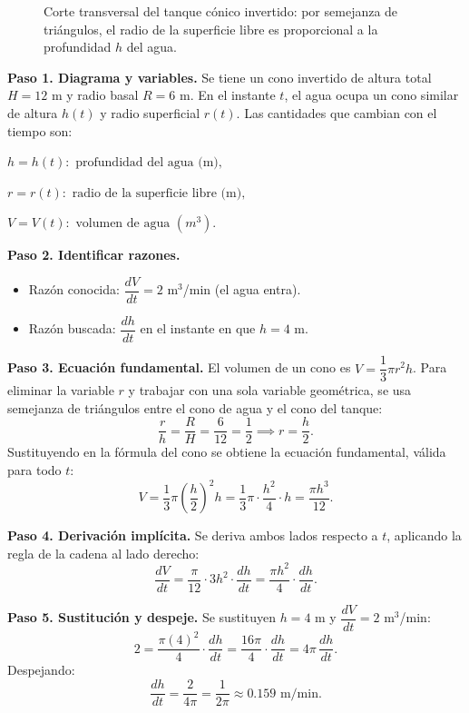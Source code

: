 \begin{example}
\begin{myproof}
\begin{figure}[H]
\caption{Corte transversal del tanque cónico invertido: por semejanza de
  triángulos, el radio de la superficie libre es proporcional a la
  profundidad $h$ del agua.}
\label{fig:tanque_conico}
\end{figure}
\textbf{Paso 1. Diagrama y variables.}
Se tiene un cono invertido de altura total $H=12$ m y radio basal
$R=6$ m. En el instante $t$, el agua ocupa un cono similar de altura
$h(t)$ y radio superficial $r(t)$. Las cantidades que cambian con el
tiempo son:


\(h = h(t): \text{ profundidad del agua (m)},\) 


\(r = r(t): \text{ radio de la superficie libre (m)}, \) 


\(V = V(t): \text{ volumen de agua $(m^{3})$}.\)

\textbf{Paso 2. Identificar razones.}
\begin{itemize}
    \item Razón conocida: $\dfrac{dV}{dt} = 2$ m$^3$/min (el agua entra).
    \item Razón buscada: $\dfrac{dh}{dt}$ en el instante en que $h = 4$ m.
\end{itemize}

\textbf{Paso 3. Ecuación fundamental.}
El volumen de un cono es $V = \dfrac{1}{3}\pi r^2 h$.
Para eliminar la variable $r$ y trabajar con una sola variable
geométrica, se usa semejanza de triángulos entre el cono de agua y el
cono del tanque:
\[
\frac{r}{h} = \frac{R}{H} = \frac{6}{12} = \frac{1}{2}
\implies r = \frac{h}{2}.
\]
Sustituyendo en la fórmula del cono se obtiene la ecuación fundamental,
válida para todo $t$:
\[
V = \frac{1}{3}\pi \left(\frac{h}{2}\right)^2 h
  = \frac{1}{3}\pi \cdot \frac{h^2}{4} \cdot h
  = \frac{\pi h^3}{12}.
\]

\textbf{Paso 4. Derivación implícita.}
Se deriva ambos lados respecto a $t$, aplicando la regla de la cadena
al lado derecho:
\[
\frac{dV}{dt} = \frac{\pi}{12} \cdot 3h^2 \cdot \frac{dh}{dt}
              = \frac{\pi h^2}{4}\cdot\frac{dh}{dt}.
\]

\textbf{Paso 5. Sustitución y despeje.}
Se sustituyen $h = 4$ m y $\dfrac{dV}{dt} = 2$ m$^3$/min:
\[
2 = \frac{\pi (4)^2}{4}\cdot\frac{dh}{dt}
  = \frac{16\pi}{4}\cdot\frac{dh}{dt}
  = 4\pi\,\frac{dh}{dt}.
\]
Despejando:
\[
\frac{dh}{dt} = \frac{2}{4\pi} = \boxed{\frac{1}{2\pi} \approx 0.159 \text{ m/min.}}
\]
\end{myproof}
\end{example}


